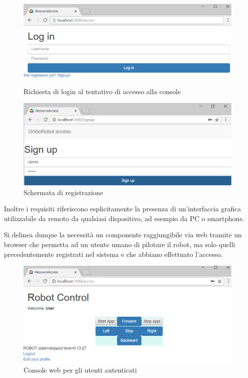\documentclass{../llncs}
\begin{document}
\begin{figure}
\centering
\includegraphics[scale=0.55]{img/screenFrontend/login.png}
\caption{Richiesta di login al tentativo di accesso alla console}

\vspace{8px}

\includegraphics[scale=0.55]{img/screenFrontend/signup.png}
\caption{Schermata di registrazione}
\end{figure}

Inoltre i requisiti riferiscono esplicitamente la presenza di un'interfaccia grafica utilizzabile da remoto da qualsiasi dispositivo, ad esempio da PC o smartphone.

Si delinea dunque la necessità un componente raggiungibile via web tramite un browser che permetta ad un utente umano di pilotare il robot, ma solo quelli precedentemente registrati nel sistema e che abbiano effettuato l'accesso.

\begin{figure}
\centering
\includegraphics[scale=0.55]{img/screenFrontend/console.png}
\caption{Console web per gli utenti autenticati}
\end{figure}
\end{document}
